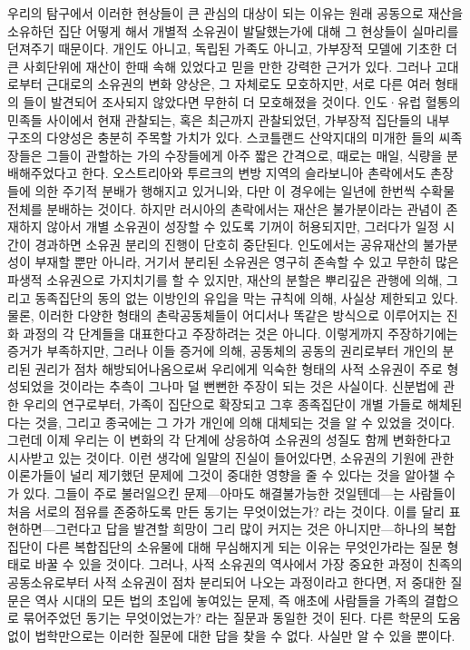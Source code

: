 우리의 탐구에서 이러한 현상들이 큰 관심의 대상이 되는 이유는
원래 공동으로 재산을 소유하던 집단 
어떻게 해서 개별적 소유권이 발달했는가에 대해
그 현상들이 실마리를 던져주기 때문이다.
개인도 아니고,
독립된 가족도 아니고,
가부장적 모델에 기초한 더 큰 사회단위에
재산이 한때 속해 있었다고 믿을 만한 강력한 근거가 있다.
그러나
고대로부터 근대로의 소유권의 변화 양상은,
그 자체로도 모호하지만,
서로 다른 여러 형태의 들이 발견되어 조사되지 않았다면
무한히 더 모호해졌을 것이다.
인도^^b7유럽 혈통의 민족들 사이에서
현재 관찰되는, 혹은 최근까지 관찰되었던,
가부장적 집단들의 내부 구조의 다양성은 충분히 주목할 가치가 있다.
스코틀랜드 산악지대의 미개한 들의 씨족장들은
그들이 관할하는 가의 수장들에게
아주 짧은 간격으로, 때로는 매일,
식량을 분배해주었다고 한다.
오스트리아와 투르크의 변방 지역의 슬라보니아 촌락에서도
촌장들에 의한 주기적 분배가 행해지고 있거니와, 다만
이 경우에는 일년에 한번씩 수확물 전체를 분배하는 것이다.
하지만 러시아의 촌락에서는
재산은 불가분이라는 관념이 존재하지 않아서
개별 소유권이 성장할 수 있도록 기꺼이 허용되지만,
그러다가 일정 시간이 경과하면 소유권 분리의 진행이 단호히 중단된다.
인도에서는 공유재산의 불가분성이 부재할 뿐만 아니라,
거기서 분리된 소유권은 영구히 존속할 수 있고
무한히 많은 파생적 소유권으로 가지치기를 할 수 있지만,
재산의 분할은
뿌리깊은 관행에 의해,
그리고 동족집단의 동의 없는 이방인의 유입을 막는 규칙에 의해,
사실상
제한되고 있다.
물론,
이러한 다양한 형태의 촌락공동체들이
어디서나 똑같은 방식으로 이루어지는 진화 과정의
각 단계들을 대표한다고 주장하려는 것은 아니다.
이렇게까지 주장하기에는 증거가 부족하지만,
그러나
이들 증거에 의해,
공동체의 공동의 권리로부터
개인의 분리된 권리가 점차 해방되어나옴으로써
우리에게 익숙한 형태의 사적 소유권이
주로 형성되었을 것이라는 추측이
그나마 덜 뻔뻔한 주장이 되는 것은 사실이다.
신분법에 관한 우리의 연구로부터,
가족이 집단으로 확장되고
그후 종족집단이 개별 가들로 해체된다는 것을,
그리고 종국에는
그 가가 개인에 의해 대체되는 것을
알 수 있었을 것이다.
그런데
이제 우리는 이 변화의 각 단계에 상응하여
소유권의 성질도 함께 변화한다고 시사받고 있는 것이다.
이런 생각에 일말의 진실이 들어있다면,
소유권의 기원에 관한 이론가들이 널리 제기했던 문제에
그것이
중대한 영향을 줄 수 있다는 것을 알아챌 수가 있다.
그들이 주로 불러일으킨 문제---아마도 해결불가능한 것일텐데---는
사람들이 처음 서로의 점유를 존중하도록 만든 동기는 무엇이었는가? 라는 것이다.
이를 달리 표현하면---그런다고 답을 발견할 희망이 그리 많이 커지는 것은
아니지만---하나의 복합집단이 다른 복합집단의 소유물에 대해
무심해지게 되는 이유는 무엇인가라는 질문 형태로 바꿀 수 있을 것이다.
그러나,
사적 소유권의 역사에서 가장 중요한 과정이
친족의 공동소유로부터 사적 소유권이 점차 분리되어 나오는 과정이라고 한다면,
저 중대한 질문은 역사 시대의 모든 법의 초입에 놓여있는 문제, 즉
애초에 사람들을 가족의 결합으로 묶어주었던 동기는 무엇이었는가? 라는 질문과
동일한 것이 된다.
다른 학문의 도움 없이 법학만으로는 이러한 질문에 대한 답을 찾을 수 없다.
사실만 알 수 있을 뿐이다.

